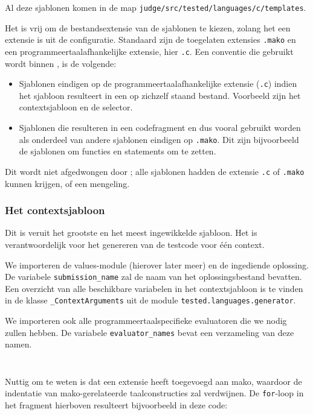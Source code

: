 Al deze sjablonen komen in de map \texttt{judge/src/tested/languages/c/templates}.

Het is vrij om de bestandsextensie van de sjablonen te kiezen, zolang het een extensie is uit de configuratie.
Standaard zijn de toegelaten extensies \texttt{.mako} en een programmeertaalafhankelijke extensie, hier \texttt{.c}.
Een conventie die gebruikt wordt binnen \tested{}, is de volgende:

\begin{itemize}
    \item Sjablonen eindigen op de programmeertaalafhankelijke extensie (\texttt{.c}) indien het sjabloon resulteert in een op zichzelf staand bestand.
    Voorbeeld zijn het contextsjabloon en de selector.
    \item Sjablonen die resulteren in een codefragment en dus vooral gebruikt worden als onderdeel van andere sjablonen eindigen op \texttt{.mako}.
    Dit zijn bijvoorbeeld de sjablonen om functies en statements om te zetten.
\end{itemize}

Dit wordt niet afgedwongen door \tested{};
alle sjablonen hadden de extensie \texttt{.c} of \texttt{.mako} kunnen krijgen, of een mengeling.

\subsubsection{Het contextsjabloon}

Dit is veruit het grootste en het meest ingewikkelde sjabloon.
Het is verantwoordelijk voor het genereren van de testcode voor één context.

We importeren de values-module (hierover later meer) en de ingediende oplossing.
De variabele \texttt{submission\_name} zal de naam van het oplossingsbestand bevatten.
Een overzicht van alle beschikbare variabelen in het contextsjabloon is te vinden in de klasse \texttt{\_ContextArguments} uit de module \texttt{tested.languages.generator}.

We importeren ook alle programmeertaalspecifieke evaluatoren die we nodig zullen hebben.
De variabele \texttt{evaluator\_names} bevat een verzameling van deze namen.

\inputminted[firstline=3,lastline=7]{mako}{sources/c-context.mako}
\vspace{-1.7cm} %
\inputminted[firstline=9,lastline=11]{mako}{sources/c-context.mako}

Nuttig om te weten is dat \tested{} een extensie heeft toegevoegd aan mako, waardoor de indentatie van mako-gerelateerde taalconstructies zal verdwijnen.
De \texttt{for}-loop in het fragment hierboven resulteert bijvoorbeeld in deze code:

